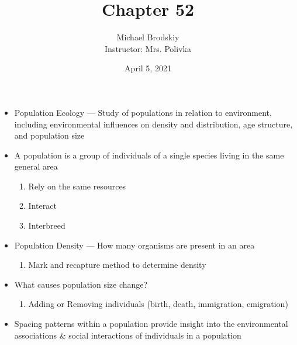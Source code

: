 \documentclass[12pt]{article}
\title{Chapter 52}
\date{April 5, 2021}
\author{Michael Brodskiy\\ \small Instructor: Mrs. Polivka}
\begin{document}
\maketitle

\begin{itemize}

  \item Population Ecology — Study of populations in relation to environment, including environmental influences on density and distribution, age structure, and population size

  \item A population is a group of individuals of a single species living in the same general area

    \begin{enumerate}

      \item Rely on the same resources

      \item Interact

      \item Interbreed

    \end{enumerate}

  \item Population Density — How many organisms are present in an area

    \begin{enumerate}

      \item Mark and recapture method to determine density

    \end{enumerate}

  \item What causes population size change?

    \begin{enumerate}

      \item Adding or Removing individuals (birth, death, immigration, emigration)

    \end{enumerate}

  \item Spacing patterns within a population provide insight into the environmental associations \& social interactions of individuals in a population

    \begin{enumerate}


\end{enumerate}
\end{itemize}
\end{document}
